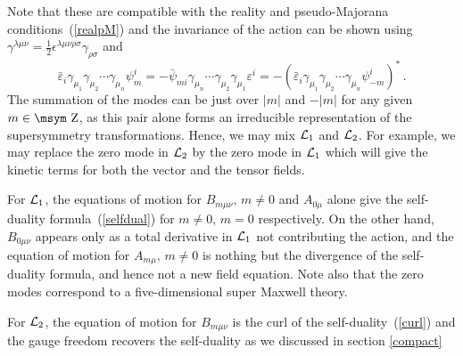 \documentclass[a4paper,12pt]{article}
\def\Integer{{\mathop{\hbox{\msym \char  '132}}}}
\def\L{{\cal L}}
\begin{document}
Note that these are compatible with the reality and pseudo-Majorana conditions~(\ref{realpM}) and the invariance of the action can be shown using 
$\gamma^{\lambda\mu\nu}=\textstyle{\frac{1}{2}}
\epsilon^{\lambda\mu\nu\rho\sigma}\gamma_{\rho\sigma}$ and
\begin{equation}
\bar{\varepsilon}_{i}\gamma_{\mu_{1}}\gamma_{\mu_{2}}\cdots\gamma_{\mu_{n}}\psi^{i}_{m}=-\bar{\psi}_{mi}\gamma_{\mu_{n}}\cdots\gamma_{\mu_{2}}\gamma_{\mu_{1}}\varepsilon^{i}=-(\bar{\varepsilon}_{i}\gamma_{\mu_{1}}\gamma_{\mu_{2}}\cdots\gamma_{\mu_{n}}\psi^{i}_{-m})^{*}\,.
\end{equation}
The summation of the modes can be just over $|m|$ and $-|m|$  for any given $m\in\Integer$, as this pair alone forms an irreducible representation of the supersymmetry transformations. Hence, we may mix $\L_{1}$ and $\L_{2}$. For example,  we may replace the zero mode in $\L_{2}$ by the zero mode in $\L_{1}$ which will give the kinetic terms for both  the vector and the tensor fields.\newline




For $\L_{1}$,  the equations of motion for $B_{m\mu\nu},\,m\neq 0$ and $A_{0\mu}$ alone give  the  self-duality formula~(\ref{selfdual}) for $m\neq 0,\,m=0$ respectively.  On the other hand, $B_{0\mu\nu}$ appears only as a total derivative in $\L_{1}$ not contributing the action, and the equation of motion for $A_{m\mu},\,m\neq 0$ 
is  nothing but the divergence of the self-duality formula, and hence not a new field equation. Note also that  the zero modes correspond to  a five-dimensional super Maxwell theory.\newline





For $\L_{2}$, the equation of motion for $B_{m\mu\nu}$ is the curl of the self-duality~(\ref{curl}) and  the  gauge freedom recovers the  self-duality as we discussed in section \ref{compact}  \newline
\end{document}
